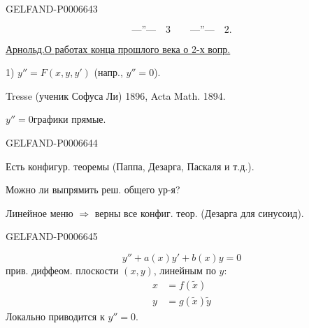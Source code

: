 \begin{GelfandAdjacentEvidence}{GELFAND-P000664}{3}

\[
\text{---''---}\quad 3\qquad \text{---''---}\quad 2.
\]

\underline{Арнольд.}\quad\underline{О работах конца прошлого века о 2-х вопр.}

1) \(y''=F(x,y,y')\) (напр., \(y''=0\)).

Tresse (ученик Софуса Ли) 1896, Acta Math. 1894.

\(y''=0\)\quad графики прямые.
\end{GelfandAdjacentEvidence}
\begin{GelfandAdjacentEvidence}{GELFAND-P000664}{4}


Есть конфигур. теоремы (Паппа, Дезарга, Паскаля и т.д.).

Можно ли выпрямить реш. общего ур-я?

Линейное меню \(\Longrightarrow\) верны все конфиг. теор. (Дезарга для синусоид).
\end{GelfandAdjacentEvidence}
\begin{GelfandAdjacentEvidence}{GELFAND-P000664}{5}

\end{GelfandAdjacentEvidence}

\[
y''+a(x)y'+b(x)y=0
\]
прив. диффеом. плоскости \((x,y)\), линейным по \(y\):
\[
\begin{aligned}
x&=f(\tilde x)\\
y&=g(\tilde x)\tilde y
\end{aligned}
\]
Локально приводится к \(y''=0\).


